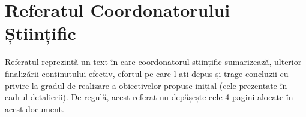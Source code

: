 \chapter*{Referatul Coordonatorului Științific}

\thispagestyle{front}
\pagestyle{front}

{
    \color{gray}
    Referatul reprezintă un text în care coordonatorul științific sumarizează, ulterior finalizării conținutului efectiv, efortul pe care l-ați depus și trage concluzii cu privire la gradul de realizare a obiectivelor propuse inițial (cele prezentate în cadrul detalierii). De regulă, acest referat nu depășește cele 4 pagini alocate în acest document.
}


\newpage \
\newpage \
\newpage \
\newpage